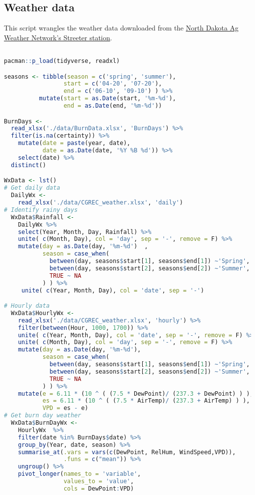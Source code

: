 \documentclass[
]{article}
\begin{document}
\newpage
\subsection{Weather data}\label{weather-data}

This script wrangles the weather data downloaded from the
\href{https://ndawn.ndsu.nodak.edu/station-info.html?station=48}{North
Dakota Ag Weather Network's Streeter station}.

\begin{lstlisting}[language=R] 

pacman::p_load(tidyverse, readxl)

seasons <- tibble(season = c('spring', 'summer'), 
                 start = c('04-20', '07-20'), 
                 end = c('06-10', '09-10') ) %>%
          mutate(start = as.Date(start, '%m-%d'), 
                 end = as.Date(end, '%m-%d'))

BurnDays <- 
  read_xlsx('./data/BurnData.xlsx', 'BurnDays') %>%
  filter(is.na(certainty)) %>%
    mutate(date = paste(year, date), 
           date = as.Date(date, '%Y %B %d')) %>%
    select(date) %>%
  distinct() 

WxData <- lst() 
# Get daily data 
  DailyWx <- 
    read_xlsx('./data/CGREC_weather.xlsx', 'daily')
# Identify rainy days
  WxData$Rainfall <-
    DailyWx %>%
    select(Year, Month, Day, Rainfall) %>% 
    unite( c(Month, Day), col = 'day', sep = '-', remove = F) %>%
    mutate(day = as.Date(day, '%m-%d')  , 
           season = case_when(
             between(day, seasons$start[1], seasons$end[1]) ~'Spring', 
             between(day, seasons$start[2], seasons$end[2]) ~'Summer',
             TRUE ~ NA      
           ) ) %>% 
     unite( c(Year, Month, Day), col = 'date', sep = '-')

# Hourly data 
  WxData$HourlyWx <- 
    read_xlsx('./data/CGREC_weather.xlsx', 'hourly') %>%
    filter(between(Hour, 1000, 1700)) %>%
    unite( c(Year, Month, Day), col = 'date', sep = '-', remove = F) %>%
    unite( c(Month, Day), col = 'day', sep = '-', remove = F) %>%
    mutate(day = as.Date(day, '%m-%d'), 
           season = case_when(
             between(day, seasons$start[1], seasons$end[1]) ~'Spring', 
             between(day, seasons$start[2], seasons$end[2]) ~'Summer',
             TRUE ~ NA      
           ) ) %>%
    mutate(e = 6.11 * (10 ^ ( (7.5 * DewPoint)/ (237.3 + DewPoint) ) ), 
           es = 6.11 * (10 ^ ( (7.5 * AirTemp)/ (237.3 + AirTemp) ) ), 
           VPD = es - e) 
# Get burn day weather
  WxData$BurnDayWx <-
    HourlyWx  %>% 
    filter(date %in% BurnDays$date) %>%
    group_by(Year, date, season) %>%
    summarise_at(.vars = vars(c(DewPoint, RelHum, WindSpeed,VPD)),
                 .funs = c("mean")) %>%
    ungroup() %>%
    pivot_longer(names_to = 'variable', 
                 values_to = 'value', 
                 cols = DewPoint:VPD) 
\end{lstlisting}
\end{document}
